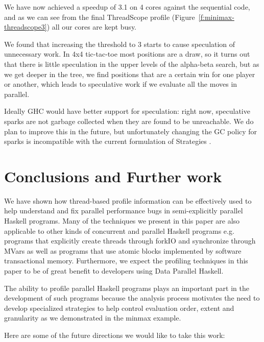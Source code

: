 \documentclass[twocolumn,9pt]{sigplanconf}
\newcommand{\codef}[1]{{\fontfamily{cmss}\small#1}}
\let\cite=\citep
\begin{document}
We have now achieved a speedup of 3.1 on 4 cores against the
sequential code, and as we can see from the final ThreadScope profile
(Figure~\ref{f:minimax-threadscope3}) all our cores are kept busy.

We found that increasing the threshold to 3 starts to cause
speculation of unnecessary work.  In 4x4 tic-tac-toe most positions
are a draw, so it turns out that there is little speculation in the
upper levels of the alpha-beta search, but as we get deeper in the
tree, we find positions that are a certain win for one player or
another, which leads to speculative work if we evaluate all the moves
in parallel.  

Ideally GHC would have better support for speculation: right now,
speculative sparks are not garbage collected when they are found to be
unreachable.  We do plan to improve this in the future, but
unfortunately changing the GC policy for sparks is incompatible with
the current formulation of Strategies \cite{multicore-ghc}.







\section{Conclusions and Further work}
\label{s:conclusion}
We have shown how thread-based profile information can be effectively
used to help understand and fix parallel performance bugs in 
semi-explicitly parallel Haskell programs. Many of the techniques
we present in this paper are also applicable to other kinds of
concurrent and parallel Haskell programs e.g. programs that
explicitly create threads through \codef{forkIO} and synchronize
through \codef{MVars} as well as programs that use atomic blocks
implemented by software transactional memory. Furthermore, we expect
the profiling techniques in this paper to be of great benefit to
developers using Data Parallel Haskell. 

The ability to profile parallel Haskell programs plays an important
part in the development of such programs because the analysis
process motivates the need to develop specialized strategies to
help control evaluation order, extent and granularity as we demonstrated in
the minmax example.

Here are some of the future directions we would like to take this
work:
\end{document}
